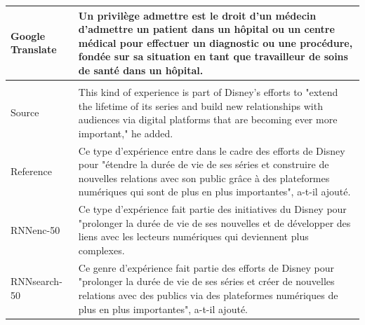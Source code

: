 \documentclass{article} %
\begin{document}
\begin{table}[htp]
\begin{minipage}{0.99\textwidth}
\begin{tabular}{p{1.9cm} | p{12cm}}
\hline Google \mbox{Translate} & Un privilège admettre est le droit d'un m\'edecin
d'admettre un patient dans un h\^opital ou un centre m\'edical pour effectuer un
diagnostic ou une proc\'edure, fond\'ee sur sa situation en tant que travailleur de
soins de sant\'e dans un h\^opital.
\\
\hline
\multicolumn{2}{c}{} \\
\hline Source & 
This kind of experience is part of Disney's efforts to "extend
the lifetime of its series and build new relationships with audiences via
digital platforms that are becoming ever more important," he added.
\\
\hline Reference & Ce type d'exp\'erience entre dans le cadre des efforts de Disney pour "\'etendre la dur\'ee de vie de ses s\'eries et construire de nouvelles relations avec son public grâce à des plateformes num\'eriques qui sont de plus en plus importantes", a-t-il ajout\'e.
\\
\hline RNNenc-50 & Ce type d'exp\'erience fait partie des initiatives du Disney pour "prolonger la dur\'ee de vie de ses nouvelles et de d\'evelopper des liens avec les lecteurs num\'eriques qui deviennent plus complexes.
\\
\hline RNNsearch-50 & Ce genre d'exp\'erience fait partie des efforts de Disney pour "prolonger la dur\'ee de vie de ses s\'eries et cr\'eer de nouvelles relations avec des publics via des plateformes num\'eriques de plus en plus importantes", a-t-il ajout\'e.

\end{tabular}
\end{minipage}
\end{table}
\end{document}
